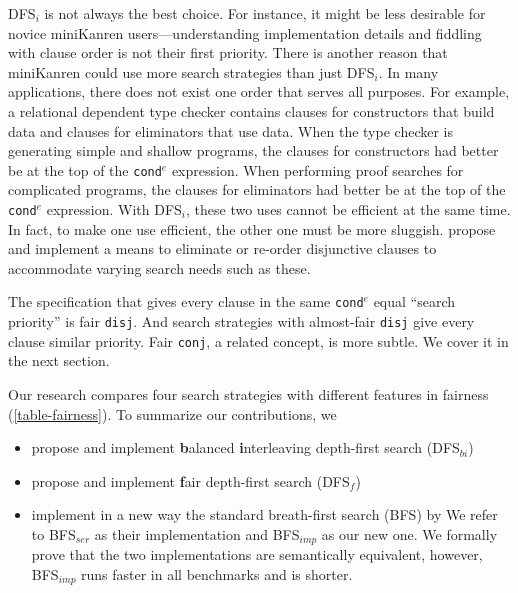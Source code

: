 \documentclass[acmlarge, review=true]{acmart}
\newcommand{\conde}{\texttt{cond$^e$}}
\newcommand{\conj}{\texttt{conj}}
\newcommand{\disj}{\texttt{disj}}
\newcommand{\DFSi }[0]{DFS$_{i}$}
\newcommand{\DFSf }[0]{DFS$_{f}$}
\newcommand{\DFSbi}[0]{DFS$_{bi}$}
\newcommand{\BFS}[0]{BFS}
\newcommand{\BFSser}[0]{BFS$_{ser}$}
\newcommand{\BFSimp}[0]{BFS$_{imp}$}
\begin{document}
\DFSi{} is not always the best choice. For instance, it might be less 
desirable for novice miniKanren users---understanding implementation details 
and fiddling with clause order is not their first priority. 
There is another reason that miniKanren could use more search strategies than
just \DFSi. In many applications, there does not exist one order that serves all
purposes. For example, a relational dependent type checker contains
clauses for constructors that build data and clauses for eliminators that use
data. When the type checker is generating simple and shallow programs,
the clauses for constructors had better be at the top of the
\conde{} expression.
When performing proof searches for complicated programs, the clauses for 
eliminators had better be at the top of the \conde{} expression. With \DFSi, 
these two uses cannot be efficient at the same time. In fact, to make one use 
efficient, the other one must be more sluggish. \citet{boskin} propose and 
implement a means to eliminate or re-order disjunctive clauses to accommodate 
varying search needs such as these.

The specification that gives every clause in the same \conde{} equal 
``search priority'' is fair \disj{}. And search strategies with 
almost-fair \disj{} give every clause similar priority. 
Fair \conj{}, a related concept, is more subtle. We cover it in the next 
section.


Our research compares four search strategies with different features in fairness
(\autoref{table-fairness}). To summarize our contributions, we
\begin{itemize}
	\item propose and implement \textbf{b}alanced \textbf{i}nterleaving 
	depth-first search (\DFSbi{})
	\item propose and implement \textbf{f}air depth-first search (\DFSf{})
	\item implement in a new way the standard breath-first search (\BFS) by 
	\citet{seres1999algebra}
	We refer to \BFSser{} as their implementation and \BFSimp{} as our new 
	one. We formally prove that the two implementations are 
	semantically equivalent, however, \BFSimp{} runs faster in all benchmarks 
	and 
	is shorter.
\end{itemize}
\end{document}
